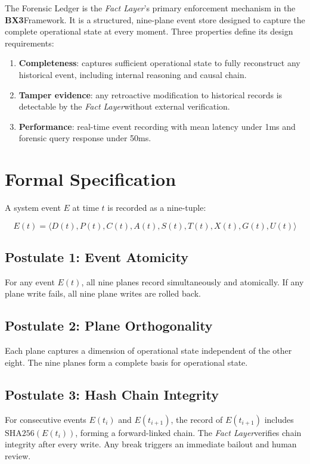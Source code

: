 \documentclass[12pt]{article}
\newcommand{\bxthree}{\textbf{BX3}}
\newcommand{\fact}{\textit{Fact Layer}}
\begin{document}
The Forensic Ledger is the \fact's primary enforcement mechanism in the \bxthree Framework. It is a structured, nine-plane event store designed to capture the complete operational state at every moment. Three properties define its design requirements:

\begin{enumerate}[noitemsep]
    \item \textbf{Completeness}: captures sufficient operational state to fully reconstruct any historical event, including internal reasoning and causal chain.
    \item \textbf{Tamper evidence}: any retroactive modification to historical records is detectable by the \fact without external verification.
    \item \textbf{Performance}: real-time event recording with mean latency under 1ms and forensic query response under 50ms.
\end{enumerate}

\section{Formal Specification}
\label{sec:formal}

A system event $E$ at time $t$ is recorded as a nine-tuple:

$$E(t) = \langle D(t), P(t), C(t), A(t), S(t), T(t), X(t), G(t), U(t) \rangle$$

\subsection*{Postulate 1: Event Atomicity}
\label{post:e1}
For any event $E(t)$, all nine planes record simultaneously and atomically. If any plane write fails, all nine plane writes are rolled back.

\subsection*{Postulate 2: Plane Orthogonality}
\label{post:e2}
Each plane captures a dimension of operational state independent of the other eight. The nine planes form a complete basis for operational state.

\subsection*{Postulate 3: Hash Chain Integrity}
\label{post:e3}
For consecutive events $E(t_i)$ and $E(t_{i+1})$, the record of $E(t_{i+1})$ includes $\text{SHA256}(E(t_i))$, forming a forward-linked chain. The \fact verifies chain integrity after every write. Any break triggers an immediate bailout and human review.
\end{document}
